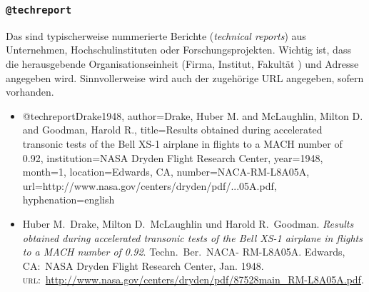 \subsubsection{\texttt{@techreport}}
\label{sec:@techreport}
Das sind typischerweise nummerierte Berichte (\emph{technical reports}) aus Unternehmen, 
Hochschulinstituten oder Forschungsprojekten.
Wichtig ist, dass die herausgebende Organisationseinheit (Firma, Institut, Fakultät \etc) und 
Adresse angegeben wird. Sinnvollerweise wird auch der zugehörige URL angegeben, sofern vorhanden. 
%
\begin{itemize}
\item[]
\begin{GenericCode}[numbers=none]
@techreport{Drake1948,
  author={Drake, Huber M. and McLaughlin, Milton D. and Goodman, Harold R.},
  title={Results obtained during accelerated transonic tests of the {Bell} {XS-1} airplane in flights to a {MACH} number of 0.92},
  institution={NASA Dryden Flight Research Center},
  year={1948},
  month={1},
  location={Edwards, CA},
  number={NACA-RM-L8A05A},
  url={http://www.nasa.gov/centers/dryden/pdf/...05A.pdf},
  hyphenation={english}
}
\end{GenericCode}
\item[\cite{Drake1948}]
Huber M.\ Drake, Milton D.\ McLaughlin und Harold R.\ Goodman.
\textit{Results obtained during accelerated transonic tests of the Bell XS-1
airplane in flights to a MACH number of 0.92}. Techn.\ Ber.\ NACA-
RM-L8A05A. Edwards, CA:\ NASA Dryden Flight Research Center,
Jan. 1948. \textsc{url}:\ \url{http://www.nasa.gov/centers/dryden/pdf/87528main_RM-L8A05A.pdf}.
\end{itemize}


